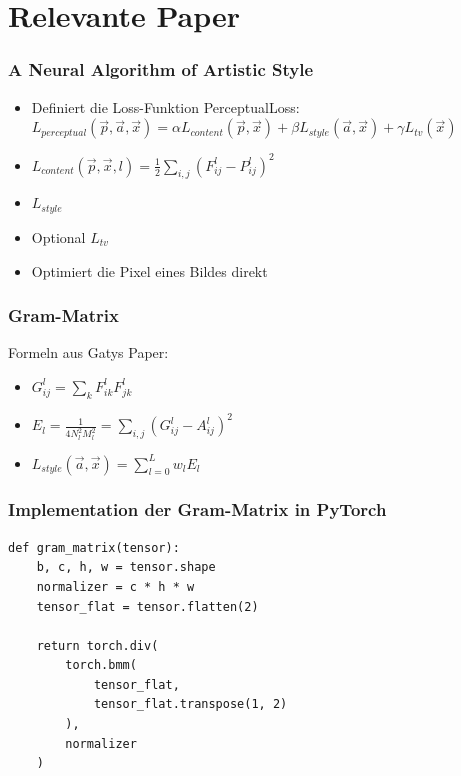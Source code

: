 \section{Relevante Paper}

\begin{frame}
    \frametitle{A Neural Algorithm of Artistic Style \cite{DBLP:journals/corr/GatysEB15a}}

    \begin{itemize}
        \item Definiert die Loss-Funktion PerceptualLoss: $ L_{perceptual} ( \vec{p}, \vec{a}, \vec{x} ) = \alpha L_{content} ( \vec{p}, \vec{x} ) + \beta L_{style} ( \vec{a}, \vec{x} ) + \gamma L_{tv} ( \vec{x} ) $ \pause
        \item $ L_{content} ( \vec{p}, \vec{x}, l ) = \frac{1}{2} \sum_{i, j} (F_{ij}^{l} - P_{ij}^{l})^2 $ \pause
        \item $ L_{style} $  \pause
        \item Optional $ L_{tv} $ \pause
        \item Optimiert die Pixel eines Bildes direkt
    \end{itemize}
    

\end{frame}

\begin{frame}
    \frametitle{Gram-Matrix}

    Formeln aus Gatys Paper:

    \begin{itemize}
        \item $ G_{ij}^{l} = \sum_{k} F_{ik}^{l} F_{jk}^{l} $
        \item $ E_{l} = \frac{1}{4N_{l}^{2} M_{l}^2} = \sum_{i, j} ( G_{ij}^{l} - A_{ij}^{l} )^2 $
        \item $ L_{style} ( \vec{a}, \vec{x} ) = \sum_{l=0}^{L} w_{l} E_{l} $
    \end{itemize}
\end{frame}

\begin{frame}[fragile]
\frametitle{Implementation der Gram-Matrix in PyTorch}


\begin{listing}[H]
\begin{verbatim}
def gram_matrix(tensor):
    b, c, h, w = tensor.shape
    normalizer = c * h * w
    tensor_flat = tensor.flatten(2)

    return torch.div(
        torch.bmm(
            tensor_flat,
            tensor_flat.transpose(1, 2)
        ),
        normalizer
    )
\end{verbatim}
\end{listing}
    


\end{frame}

